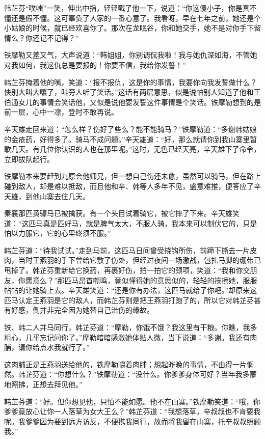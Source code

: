 \documentclass[12pt,oneside]{book}
\begin{document}
韩芷芬``噗嗤''一笑，伸出中指，轻轻戳了他一下，说道：``你这傻小子，你是真不懂还是假不懂。这可辜负了人家的一番心意了。我看呀，早在七年之前，她还是个小姑娘的时候，就已经欢喜你了。那次在龙眠谷，你和她交手，她不是对你手下留情么？你还记不记得？''

铁摩勒又羞又气，大声说道：``韩姐姐，你别调侃我啦！我与她仇深如海，不管她对我如何，我这仇总是要报的！你要不信，我给你发誓！''

韩芷芬掩着他的嘴，笑道：``报不报仇，这是你的事情，我要你向我发誓做什么？快别大叫大嚷了，叫旁人听了笑话。''这话有两层意思，似是说怕别人知道了他和王伯通女儿的事情会笑话他，又似是说他要发誓这件事情是个笑话。铁摩勒想到的是前一层，心中一凛，登时不敢再说。

辛天雄走回来道：``怎么样？伤好了些么？能不能骑马？''铁摩勒道：``多谢韩姑娘的金疮药，好得多了。骑马不成问题。''辛天雄道：``好，那么就请你到我山寨里暂歇几天。有几位你认识的人也在那里呢。''这时，无色已经天亮，辛天雄下了命令，立即拔队起行。

铁摩勒本来要赶到九原会他师兄，但一想自己伤还未愈，虽然可以骑马，但在路上碰到敌人，却是难以抵敌，而且他和辛、韩等人多年不见，盛意难推，便答应了辛天雄，到他山寨去住几天。

秦襄那匹黄骠马已被擒获。有一个头目试着骑它，被它摔了下来。辛天雄笑道：``这匹马真是匹好马，就是脾气太大，不服人骑，我本来可以制伏它的，只是怕以力服它，它的心里终须不服。''

韩芷芬道：``待我试试。''走到马前，这匹马日间曾受挠钩所伤，前蹄下撕去一片皮肉，当时王燕羽的手下曾给它敷了伤处，但经过夜间一场激战，包扎马脚的绷带已甩掉了。韩芷芬重新给它换药，再裹好伤，拍一拍它的颈项，笑道：``我和你交朋友，你愿意么？''那匹马昂首嘶鸣，竟似懂得她的意思似的，轻轻的挨擦她，服服帖帖的让她骑上去。辛天雄笑道：``还是你有办法，这匹马就给了你吧。''却原来这匹马认定王燕羽是它的敌人，而韩芷芬则是把王燕羽打跑了的，所以它对韩芷芬甚有好感，倒并非完全因为她替自己治伤的缘故。

铁、韩二人并马同行，韩芷芬道：``摩勒，你饿不饿？我这里有干粮。你瞧，我多粗心，几乎忘记问你了。''摩勒暗暗感激她体贴人微，当下说道：``多谢。我还有肉脯，请你给点水我就行了。''

这肉脯正是王燕羽送给他的，铁摩勒嚼着肉脯；想起昨晚的事情，不由得一片惘然。韩芷芬道：``你想什么？''铁摩勒道：``没什么。你爹爹身体可好？当年我多蒙地照拂，正想去拜见他。''

韩芷芬道：``好。但你想见他，只怕不能如愿。他不在山寨。''铁摩勒笑道：``哦，你爹爹竟放心让你一人落草为女大王么？''韩芷芬道：``我想落草，辛叔叔也不肯要我呢。我爹爹因为要到远方访反，不便携我同行，故而将我留在山寨，托辛叔叔照顾我。''
\end{document}
